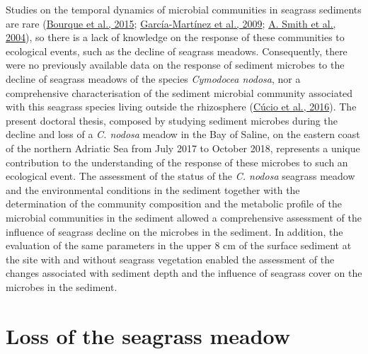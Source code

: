 \documentclass[
  12 pt,
]{book}
\begin{document}
Studies on the temporal dynamics of microbial communities in seagrass sediments are rare (\protect\hyperlink{ref-Bourque2015}{Bourque et al., 2015}; \protect\hyperlink{ref-Garcia-Martinez2009}{García-Martínez et al., 2009}; \protect\hyperlink{ref-Smith2004}{A. Smith et al., 2004}), so there is a lack of knowledge on the response of these communities to ecological events, such as the decline of seagrass meadows. Consequently, there were no previously available data on the response of sediment microbes to the decline of seagrass meadows of the species \emph{Cymodocea nodosa}, nor a comprehensive characterisation of the sediment microbial community associated with this seagrass species living outside the rhizosphere (\protect\hyperlink{ref-Cucio2016}{Cúcio et al., 2016}). The present doctoral thesis, composed by studying sediment microbes during the decline and loss of a \emph{C. nodosa} meadow in the Bay of Saline, on the eastern coast of the northern Adriatic Sea from July 2017 to October 2018, represents a unique contribution to the understanding of the response of these microbes to such an ecological event. The assessment of the status of the \emph{C. nodosa} seagrass meadow and the environmental conditions in the sediment together with the determination of the community composition and the metabolic profile of the microbial communities in the sediment allowed a comprehensive assessment of the influence of seagrass decline on the microbes in the sediment. In addition, the evaluation of the same parameters in the upper 8 \si{\cm} of the surface sediment at the site with and without seagrass vegetation enabled the assessment of the changes associated with sediment depth and the influence of seagrass cover on the microbes in the sediment.

\hypertarget{loss-of-the-seagrass-meadow}{%
\section{Loss of the seagrass meadow}\label{loss-of-the-seagrass-meadow}}
\end{document}
